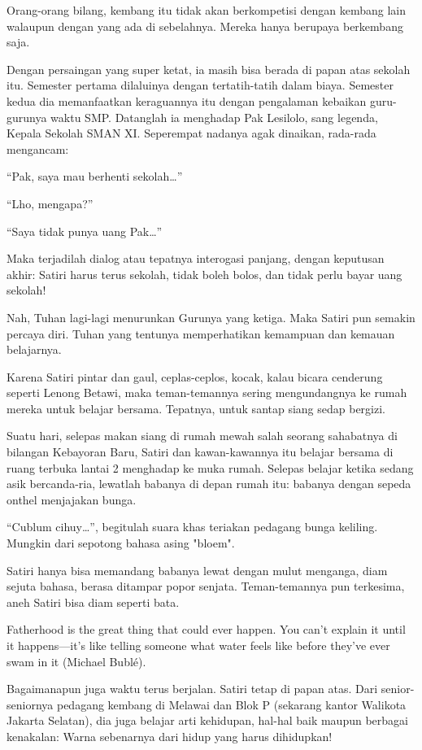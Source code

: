 Orang-orang bilang, kembang itu tidak akan berkompetisi dengan kembang lain walaupun dengan yang ada di sebelahnya. Mereka hanya berupaya berkembang saja.

Dengan persaingan yang super ketat, ia masih bisa berada di papan atas sekolah itu. Semester pertama dilaluinya dengan tertatih-tatih dalam biaya. Semester kedua dia memanfaatkan keraguannya itu dengan pengalaman kebaikan guru-gurunya waktu SMP. Datanglah ia menghadap Pak Lesilolo, sang legenda, Kepala Sekolah SMAN XI. Seperempat nadanya agak dinaikan, rada-rada mengancam:

“Pak, saya mau berhenti sekolah…”

“Lho, mengapa?”

“Saya tidak punya uang Pak…”

Maka terjadilah dialog atau tepatnya interogasi panjang, dengan keputusan akhir: Satiri harus terus sekolah, tidak boleh bolos, dan tidak perlu bayar uang sekolah!

Nah, Tuhan lagi-lagi menurunkan Gurunya yang ketiga. Maka Satiri pun semakin percaya diri. Tuhan yang tentunya memperhatikan kemampuan dan kemauan belajarnya.

Karena Satiri pintar dan gaul, ceplas-ceplos, kocak, kalau bicara cenderung seperti Lenong Betawi, maka teman-temannya sering mengundangnya ke rumah mereka untuk belajar bersama. Tepatnya, untuk santap siang sedap bergizi.

Suatu hari, selepas makan siang di rumah mewah salah seorang sahabatnya di bilangan Kebayoran Baru, Satiri dan kawan-kawannya itu belajar bersama di ruang terbuka lantai 2 menghadap ke muka rumah. Selepas belajar ketika sedang asik bercanda-ria, lewatlah babanya di depan rumah itu: babanya dengan sepeda onthel menjajakan bunga.

“Cublum cihuy…”, begitulah suara khas teriakan pedagang bunga keliling. Mungkin dari sepotong bahasa asing "bloem".

Satiri hanya bisa memandang babanya lewat dengan mulut menganga, diam sejuta bahasa, berasa ditampar popor senjata. Teman-temannya pun terkesima, aneh Satiri bisa diam seperti bata.

Fatherhood is the great thing that could ever happen. You can't explain it until it happens—it's like telling someone what water feels like before they've ever swam in it (Michael Bublé).

Bagaimanapun juga waktu terus berjalan. Satiri tetap di papan atas. Dari senior-seniornya pedagang kembang di Melawai dan Blok P (sekarang kantor Walikota Jakarta Selatan), dia juga belajar arti kehidupan, hal-hal baik maupun berbagai kenakalan: Warna sebenarnya dari hidup yang harus dihidupkan!

